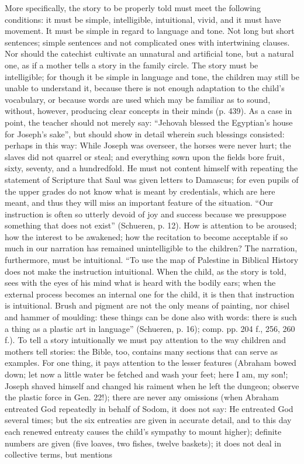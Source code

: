 More specifically, the story to be properly told must meet the following conditions: it must be simple, intelligible, intuitional, vivid, and it must have movement. It must be simple in regard to language and tone. Not long but short sentences; simple sentences and not complicated
ones with intertwining clauses. Nor should the catechist cultivate an unnatural and artificial tone, but a natural one, as if a mother tells a story in the family circle. The story must be intelligible; for though it be simple in language and tone, the children may still be unable to understand it, because there is not enough adaptation to the child’s vocabulary, or because words are used which may be familiar as to sound, without, however, producing clear concepts in their minds (p. 439). As a case in point, the teacher should not merely say: “Jehovah blessed the Egyptian’s house for Joseph’s sake”, but should show in detail wherein such blessings consisted: perhaps in this way: While Joseph was overseer, the horses were never hurt; the slaves did not quarrel or steal; and everything sown upon the fields bore fruit, sixty, seventy, and a hundredfold. He must not content himself with repeating the statement of Scripture that Saul was given letters to Damascus; for even pupils of the upper grades do not know what is meant by credentials, which are here meant, and thus they will miss an important feature of the situation. “Our instruction is often so utterly devoid of joy and success because we presuppose something that does not exist” (Schueren, p. 12). How is attention to be aroused; how the interest to be awakened; how the recitation to become acceptable if so much in our narration has remained unintelligible to the children? The narration, furthermore, must be intuitional. “To use the map of Palestine in Biblical History does not make the instruction intuitional. When the child, as the story is told, sees with the eyes of his mind what is heard with the bodily ears; when the external process becomes an internal one for the child, it is then that instruction is intuitional. Brush and pigment are not the only means of painting, nor chisel and hammer of moulding: these things can be done also with words: there is such a thing as a plastic art in language” (Schueren, p. 16); comp. pp. 204 f., 256, 260 f.). To tell a story intuitionally we must pay attention to the way children and mothers tell stories: the Bible, too, contains many sections that can serve as examples. For one thing, it pays attention to the lesser features (Abraham bowed down; let now a little water be fetched and wash your feet; here I am, my son!; Joseph shaved himself and changed his raiment when he left the dungeon; observe the plastic force in Gen. 22!); there are never any omissions (when Abraham entreated God repeatedly in behalf of Sodom, it does not say: He entreated God several times; but the six entreaties are given in accurate detail, and to this day each renewed entreaty causes the child’s sympathy to mount higher); definite numbers are given (five loaves, two fishes, twelve baskets); it does not deal in collective terms, but mentions
